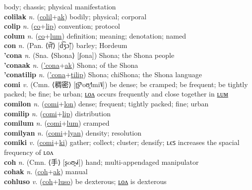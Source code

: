 body; chassis; physical manifestation \label{colil} \\
\textbf{colilak} \textit{n.} (\hyperref[colil]{colil}+\hyperref[ak]{ak})
bodily; physical; corporal \label{colilak} \\
\textbf{colip} \textit{n.} (\hyperref[co]{co}+\hyperref[lip]{lip})
convention; protocol \label{colip} \\
\textbf{colum} \textit{n.} (\hyperref[co]{co}+\hyperref[lum]{lum})
definition; meaning; denotation; named \label{colum} \\
\textbf{con} \textit{n.} (Pan. ⟨ਜੌਂ⟩ [d͡ʒɔ̃])
barley; Hordeum \label{con} \\
\textbf{'cona} \textit{n.} (Sna. ⟨Shona⟩ [ʃona])
Shona; the Shona people \label{'cona} \\
\textbf{'conaak} \textit{n.} (\hyperref['cona]{'cona}+\hyperref[ak]{ak})
Shona; of the Shona \label{'conaak} \\
\textbf{'conatilip} \textit{n.} (\hyperref['cona]{'cona}+\hyperref[tilip]{tilip})
Shona; chiShona; the Shona language \label{'conatilip} \\
\textbf{comi} \textit{v.} (Cmn. ⟨稠密⟩ [ʈ͡ʂʰoʊ̯˧˥mi˥˩])
be dense; be cramped; be frequent; be tightly packed; be fine; be urban; \hyperref[comilon]{ʟᴏᴧ} occurs frequently and close together in \hyperref[comilum]{ʟᴜᴍ} \label{comi} \\
\textbf{comilon} \textit{n.} (\hyperref[comi]{comi}+\hyperref[lon]{lon})
dense; frequent; tightly packed; fine; urban \label{comilon} \\
\textbf{comilip} \textit{n.} (\hyperref[comi]{comi}+\hyperref[lip]{lip})
distribution \label{comilip} \\
\textbf{comilum} \textit{n.} (\hyperref[comi]{comi}+\hyperref[lum]{lum})
cramped \label{comilum} \\
\textbf{comilyan} \textit{n.} (\hyperref[comi]{comi}+\hyperref[lyan]{lyan})
density; resolution \label{comilyan} \\
\textbf{comiki} \textit{v.} (\hyperref[comi]{comi}+\hyperref[ki]{ki})
gather; collect; cluster; densify; ʟєꜱ increases the spacial frequency of ʟᴏᴧ \label{comiki} \\
\textbf{coh} \textit{n.} (Cmn. ⟨手⟩ [ʂoʊ̯˧˩˧])
hand; multi-appendaged manipulator \label{coh} \\
\textbf{cohak} \textit{n.} (\hyperref[coh]{coh}+\hyperref[ak]{ak})
manual \label{cohak} \\
\textbf{cohluso} \textit{v.} (\hyperref[coh]{coh}+\hyperref[luso]{luso})
be dexterous; \hyperref[cohlusolon]{ʟᴏᴧ} is dexterous \label{cohluso} \\
